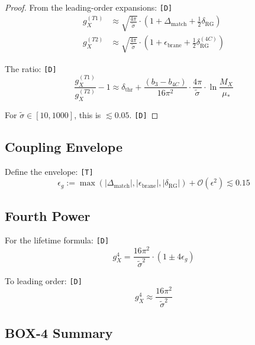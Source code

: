 \documentclass[11pt,a4paper]{article}
\newcommand{\tagD}{\textcolor{green!50!black}{\texttt{[D]}}}
\newcommand{\tagT}{\textcolor{cyan!70!black}{\texttt{[T]}}}
\theoremstyle{definition}
\begin{document}
\begin{proof}
From the leading-order expansions: \tagD{}
\begin{align}
\label{eq:gx-t1-expand}
g_X^{(T1)} &\approx \sqrt{\frac{4\pi}{\tilde{\sigma}}} \cdot (1 + \Delta_{\text{match}} + \tfrac{1}{2}\delta_{\text{RG}}) \\
\label{eq:gx-t2-expand}
g_X^{(T2)} &\approx \sqrt{\frac{4\pi}{\tilde{\sigma}}} \cdot (1 + \epsilon_{\text{brane}} + \tfrac{1}{2}\delta_{\text{RG}}^{(4C)})
\end{align}

The ratio: \tagD{}
\begin{equation}
\label{eq:ratio-expand}
\frac{g_X^{(T1)}}{g_X^{(T2)}} - 1 \approx \delta_{\text{thr}} + \frac{(b_3 - b_{4C})}{16\pi^2} \cdot \frac{4\pi}{\tilde{\sigma}} \cdot \ln\frac{M_X}{\mu_*}
\end{equation}

For $\tilde{\sigma} \in [10, 1000]$, this is $\lesssim 0.05$. \tagD{}
\end{proof}

\subsection{Coupling Envelope}
\label{subsec:coupling-envelope}

Define the envelope: \tagT{}
\begin{equation}
\label{eq:epsilon-g-def}
\epsilon_g := \max(|\Delta_{\text{match}}|, |\epsilon_{\text{brane}}|, |\delta_{\text{RG}}|) + \mathcal{O}(\epsilon^2) \lesssim 0.15
\end{equation}

\subsection{Fourth Power}
\label{subsec:gx-fourth}

For the lifetime formula: \tagD{}
\begin{equation}
\label{eq:gx-fourth-power}
g_X^4 = \frac{16\pi^2}{\tilde{\sigma}^2} \cdot (1 \pm 4\epsilon_g)
\end{equation}

To leading order: \tagD{}
\begin{equation}
\label{eq:gx-fourth-leading}
g_X^4 \approx \frac{16\pi^2}{\tilde{\sigma}^2}
\end{equation}

\subsection{BOX-4 Summary}
\label{subsec:box4-summary}
\end{document}

